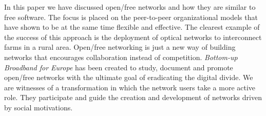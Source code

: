 \documentclass[journal]{IEEEtran}
\begin{document}
In this paper we have discussed open/free networks and how they are similar to free software.
The focus is placed on the peer-to-peer organizational models that have shown to be at the same time flexible and effective.
The clearest example of the success of this approach is the deployment of optical networks to interconnect farms in a rural area.
Open/free networking is just a new way of building networks that encourages collaboration instead of competition.
\emph{Bottom-up Broadband for Europe} has been created to study, document and promote open/free networks with the ultimate goal of eradicating the digital divide.
We are witnesses of a transformation in which the network users take a more active role.
They participate and guide the creation and development of networks driven by social motivations.


%
%



%
%
\end{document}
